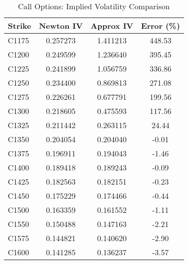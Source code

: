 \documentclass{article}
\begin{document}
\begin{table}[htbp]
    \centering
    \caption{Call Options: Implied Volatility Comparison}
    \label{tab:call_iv}
    \begin{tabular}{l S[table-format=1.6] S[table-format=1.6] S[table-format=-1.6]}
        \toprule
        Strike & {Newton IV} & {Approx IV} & {Error (\%)} \\
        \midrule
        C1175  & 0.257273    & 1.411213    & 448.53       \\
        C1200  & 0.249599    & 1.236640    & 395.45       \\
        C1225  & 0.241899    & 1.056759    & 336.86       \\
        C1250  & 0.234400    & 0.869813    & 271.08       \\
        C1275  & 0.226261    & 0.677791    & 199.56       \\
        C1300  & 0.218605    & 0.475593    & 117.56       \\
        C1325  & 0.211442    & 0.263115    & 24.44        \\
        C1350  & 0.204054    & 0.204040    & -0.01        \\
        C1375  & 0.196911    & 0.194043    & -1.46        \\
        C1400  & 0.189418    & 0.189243    & -0.09        \\
        C1425  & 0.182563    & 0.182151    & -0.23        \\
        C1450  & 0.175229    & 0.174466    & -0.44        \\
        C1500  & 0.163359    & 0.161552    & -1.11        \\
        C1550  & 0.150488    & 0.147163    & -2.21        \\
        C1575  & 0.144821    & 0.140620    & -2.90        \\
        C1600  & 0.141285    & 0.136237    & -3.57        \\
        \bottomrule
    \end{tabular}
\end{table}
\end{document}
